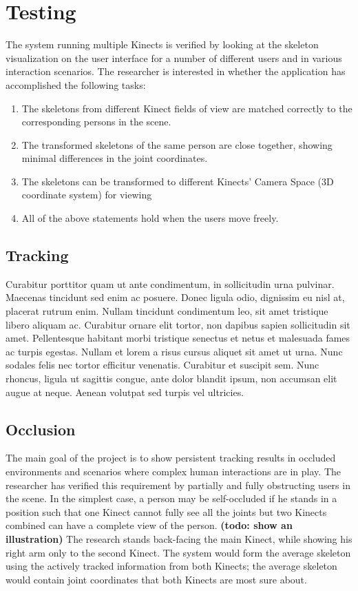 


\chapter{Testing}

\label{chapter:testing}

The system running multiple Kinects is verified by looking at the skeleton visualization on the user interface for a number of different users and in various interaction scenarios. The researcher is interested in whether the application has accomplished the following tasks:

\begin{enumerate}
  \item The skeletons from different Kinect fields of view are matched correctly to the corresponding persons in the scene.
  \item The transformed skeletons of the same person are close together, showing minimal differences in the joint coordinates.
  \item The skeletons can be transformed to different Kinects' Camera Space (3D coordinate system) for viewing
  \item All of the above statements hold when the users move freely.
\end{enumerate}

\section{Tracking}

Curabitur porttitor quam ut ante condimentum, in sollicitudin urna pulvinar. Maecenas tincidunt sed enim ac posuere. Donec ligula odio, dignissim eu nisl at, placerat rutrum enim. Nullam tincidunt condimentum leo, sit amet tristique libero aliquam ac. Curabitur ornare elit tortor, non dapibus sapien sollicitudin sit amet. Pellentesque habitant morbi tristique senectus et netus et malesuada fames ac turpis egestas. Nullam et lorem a risus cursus aliquet sit amet ut urna. Nunc sodales felis nec tortor efficitur venenatis. Curabitur et suscipit sem. Nunc rhoncus, ligula ut sagittis congue, ante dolor blandit ipsum, non accumsan elit augue at neque. Aenean volutpat sed turpis vel ultricies.

\section{Occlusion}

The main goal of the project is to show persistent tracking results in occluded environments and scenarios where complex human interactions are in play. The researcher has verified this requirement by partially and fully obstructing users in the scene. In the simplest case, a person may be self-occluded if he stands in a position such that one Kinect cannot fully see all the joints but two Kinects combined can have a complete view of the person. \textbf{(todo: show an illustration)} The research stands back-facing the main Kinect, while showing his right arm only to the second Kinect. The system would form the average skeleton using the actively tracked information from both Kinects; the average skeleton would contain joint coordinates that both Kinects are most sure about.


